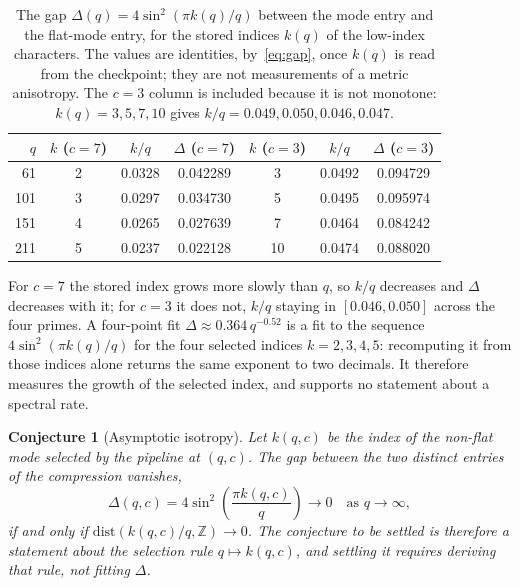 \documentclass[11pt,a4paper]{article}
\newtheorem{conjecture}[theorem]{Conjecture}
\begin{document}
    \begin{table}[ht]
      \centering
      \caption{The gap $\Delta(q) = 4\sin^2(\pi k(q)/q)$ between the mode entry and the flat-mode
        entry, for the stored indices $k(q)$ of the low-index characters.
        The values are identities, by~\eqref{eq:gap}, once $k(q)$ is read from the checkpoint; they
        are not measurements of a metric anisotropy.
        The $c = 3$ column is included because it is not monotone: $k(q) = 3, 5, 7, 10$ gives $k/q = 0.049, 0.050, 0.046, 0.047$.}
      \label{tab:asymp}
      \smallskip
      \begin{tabular}{rcccccc}
        \hline
        $q$ & $k$ ($c=7$) & $k/q$ & $\Delta$ ($c=7$) & $k$ ($c=3$) & $k/q$ & $\Delta$ ($c=3$) \\
        \hline
        61  &  2 & 0.0328 & 0.042289 &  3 & 0.0492 & 0.094729 \\
        101 &  3 & 0.0297 & 0.034730 &  5 & 0.0495 & 0.095974 \\
        151 &  4 & 0.0265 & 0.027639 &  7 & 0.0464 & 0.084242 \\
        211 &  5 & 0.0237 & 0.022128 & 10 & 0.0474 & 0.088020 \\
        \hline
      \end{tabular}
    \end{table}

    \noindent
    For $c = 7$ the stored index grows more slowly than $q$, so $k/q$ decreases and $\Delta$
    decreases with it; for $c = 3$ it does not, $k/q$ staying in $[0.046, 0.050]$ across the four
    primes.
    A four-point fit $\Delta \approx 0.364\,q^{-0.52}$ is a fit to the
    sequence $4\sin^2(\pi k(q)/q)$ for the four selected indices $k = 2,3,4,5$: recomputing it from
    those indices alone returns the same exponent to two decimals.
    It therefore measures the growth of the selected index, and supports no statement about a
    spectral rate.

    \begin{conjecture}[Asymptotic isotropy]
      \label{conj:isotropy}
      Let $k(q,c)$ be the index of the non-flat mode selected by the pipeline at $(q,c)$.
      The gap between the two distinct entries of the compression vanishes,
      \[
        \Delta(q,c) = 4\sin^2\!\left(\frac{\pi k(q,c)}{q}\right) \longrightarrow 0
        \quad \text{as } q \to \infty,
      \]
      if and only if $\mathrm{dist}(k(q,c)/q, \mathbb{Z}) \to 0$.
      The conjecture to be settled is therefore a statement about the selection rule
      $q \mapsto k(q,c)$, and settling it requires deriving that rule, not fitting $\Delta$.
    \end{conjecture}
\end{document}
